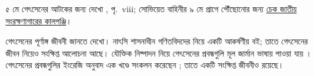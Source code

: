 \documentclass[../../../include/open-logic-section]{subfiles}
\begin{document}
\par\smallskip\noindent ৫ মে গেৎসেনের আটকের জন্য দেখো \citet{Gentzen1969}, পৃ.~viii; সোভিয়েত বাহিনীর ৯ মে প্রাগে পৌঁছোনোর জন্য \href{https://www.nacr.cz/labyrint/1945-rok-zlomu/kveten1945/08-05-1945}{চেক জাতীয় সংরক্ষণাগারের কালপঞ্জি}।

\begin{reading}
গেৎসেনের পূর্ণাঙ্গ জীবনী জানতে \citet{Menzler-Trott2007}
দেখো। নাৎসি শাসনাধীন গণিতবিদদের নিয়ে
\citet{Segal2014} একটি আকর্ষণীয় বই; তাতে গেৎসেনের
জীবন নিয়েও সংক্ষিপ্ত আলোচনা আছে। যৌক্তিক
নিষ্পাদন নিয়ে গেৎসেনের প্রবন্ধগুলি মূল জার্মান ভাষায়
পাওয়া যায় \citep{Gentzen1935a,Gentzen1935b}।
গেৎসেনের প্রবন্ধগুলির ইংরেজি অনুবাদ এক খণ্ডে
সংকলন করেছেন \citet{Gentzen1969}; তাতে একটি
সংক্ষিপ্ত জীবনীও রয়েছে।
\end{reading}
\end{document}
